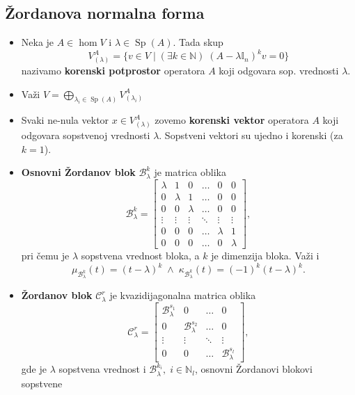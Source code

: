 \documentclass[a4paper,12pt,twoside]{report}
\numberwithin{algorithm}{section}
\begin{document}
\newpage

\subsection{Žordanova normalna forma}

\begin{itemize}
    \item Neka je $A \in \hom V$ i $\lambda \in \operatorname{Sp}(A)$. Tada skup
    \[ V_{(\lambda)}^A = \{ v \in V \;|\; (\exists k \in \mathbb{N})\; (A - \lambda\mathbb{I}_n)^kv=0 \} \]
    nazivamo \textbf{korenski potprostor} operatora $A$ koji odgovara sop. vrednosti $\lambda$.
    \item Važi $V = \bigoplus_{\lambda_i \in \operatorname{Sp}(A)}V_{(\lambda_i)}^A$ 
    \item Svaki ne-nula vektor $x \in V_{(\lambda)}^A$ zovemo \textbf{korenski vektor} operatora $A$ koji odgovara sopstvenoj vrednosti $\lambda$. Sopstveni vektori su ujedno i korenski (za $k = 1$).
    \item \textbf{Osnovni Žordanov blok} $\mathcal{B}^k_\lambda$ je matrica oblika 
    \[\mathcal{B}^k_\lambda = \begin{bmatrix}
        \lambda & 1 & 0 & \dots & 0 & 0 \\
        0 & \lambda & 1 & \dots & 0 & 0\\
        0 & 0 & \lambda & \dots & 0 & 0 \\
        \vdots & \vdots & \vdots & \ddots & \vdots & \vdots\\
        0 & 0 & 0 & \dots & \lambda & 1 \\
        0 & 0 & 0 & \dots & 0 & \lambda
    \end{bmatrix}, \]
    pri čemu je $\lambda$ sopstvena vrednost bloka, a $k$ je dimenzija bloka. Važi i
    \[ \mu_{\mathcal{B}_\lambda^k}(t) = (t-\lambda)^k  \;\land \;\kappa_{\mathcal{B}_\lambda^k}(t) = (-1)^k(t-\lambda)^k. \]
    \item \textbf{Žordanov blok} $\mathcal{C}_\lambda^r$ je kvazidijagonalna matrica oblika
    \[ \mathcal{C}_\lambda^r = \begin{bmatrix}
        \mathcal{B}_\lambda^{s_1} & 0 & \dots & 0 \\
        0 & \mathcal{B}_\lambda^{s_2} & \dots & 0\\
        \vdots & \vdots & \ddots & \vdots \\
        0 & 0 & \dots & \mathcal{B}_\lambda^{s_l}
    \end{bmatrix}, \] gde je $\lambda$ sopstvena vrednost i $\mathcal{B}_\lambda^{k_i}, \; i \in \mathbb{N}_l$, osnovni Žordanovi blokovi sopstvene 

\end{itemize}
\end{document}

